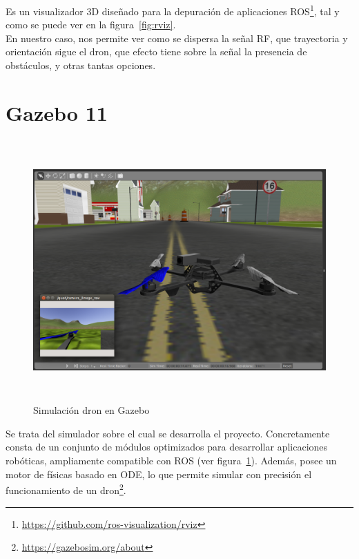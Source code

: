 Es un visualizador 3D diseñado para la depuración de aplicaciones \ac{ROS}\footnote[7]{\url{https://github.com/ros-visualization/rviz}}, tal y como se puede ver en la figura~\ref{fig:rviz}.\\

En nuestro caso, nos permite ver como se dispersa la señal \ac{RF}, que trayectoria y orientación sigue el dron, que efecto tiene sobre la señal la presencia de obstáculos, y otras tantas opciones.\\

\section{Gazebo 11}
\label{sec:gazebo}

\begin{figure} [t]
	\begin{center}
	\includegraphics[height=10cm]{imagenes/cap3/2_gazebo_drone.png}
	\end{center}
	\caption[Simulación dron en Gazebo]{Simulación dron en Gazebo}
	\label{fig:gazebo}
\end{figure}

Se trata del simulador sobre el cual se desarrolla el proyecto. Concretamente consta de un conjunto de módulos optimizados para desarrollar aplicaciones robóticas, ampliamente compatible con \ac{ROS} (ver figura~\ref{fig:gazebo}). Además, posee un motor de físicas basado en ODE, lo que permite simular con precisión el funcionamiento de un dron\footnote[8]{\url{https://gazebosim.org/about}}.\\

